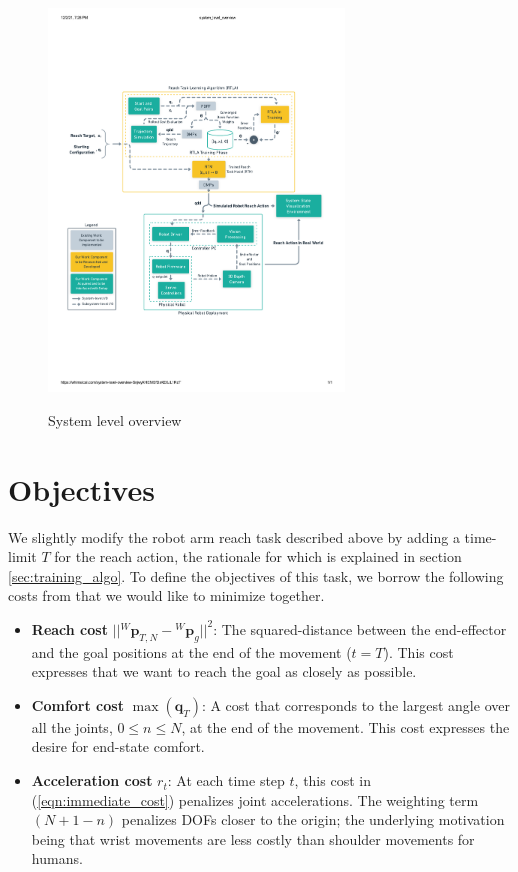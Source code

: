 \documentclass[10pt]{article}
\begin{document}
\begin{figure}[ht]
\centering
\includegraphics[width=0.7\textwidth]{system_level_overview.pdf}
\label{fig:system_level_overview}
\caption{System level overview}
\end{figure}

\section{Objectives}
We slightly modify the robot arm reach task described above by adding a time-limit $T$ for the reach action, the rationale for which is explained in section \ref{sec:training_algo}. To define the objectives of this task, we borrow the following costs from \cite{pdff} that we would like to minimize together.

\begin{itemize}
	\item \textbf{Reach cost} $||{^W\mathbf{p}_{T, N}} - {^W}\mathbf{p}_{g}||^2$: The squared-distance between the end-effector and the goal positions at the end of the movement ($t = T$). This cost expresses that we want to reach the goal as closely as possible.
	\item\textbf{Comfort cost} $\max(\mathbf{q}_T)$: A cost that corresponds to the largest angle over all  the joints, $0\leq n \leq N$, at the end of the movement. This cost expresses the desire for end-state comfort.
	\item \textbf{Acceleration cost} $r_t$: At each time step $t$, this cost in (\ref{eqn:immediate_cost}) penalizes joint accelerations. The weighting term $(N+1-n)$ penalizes DOFs closer to the origin; the underlying motivation being that wrist movements are less costly than shoulder movements for humans.
\end{itemize}
\end{document}
